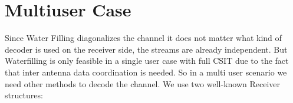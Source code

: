 \section{Multiuser Case}
Since Water Filling diagonalizes the channel it does not matter what kind of decoder is used on the receiver side, the streams are already independent. But Waterfilling is only feasible in a single user case with full CSIT due to the fact that inter antenna data coordination is needed. So in a multi user scenario we need other methods to decode the channel.
We use two well-known Receiver structures:
